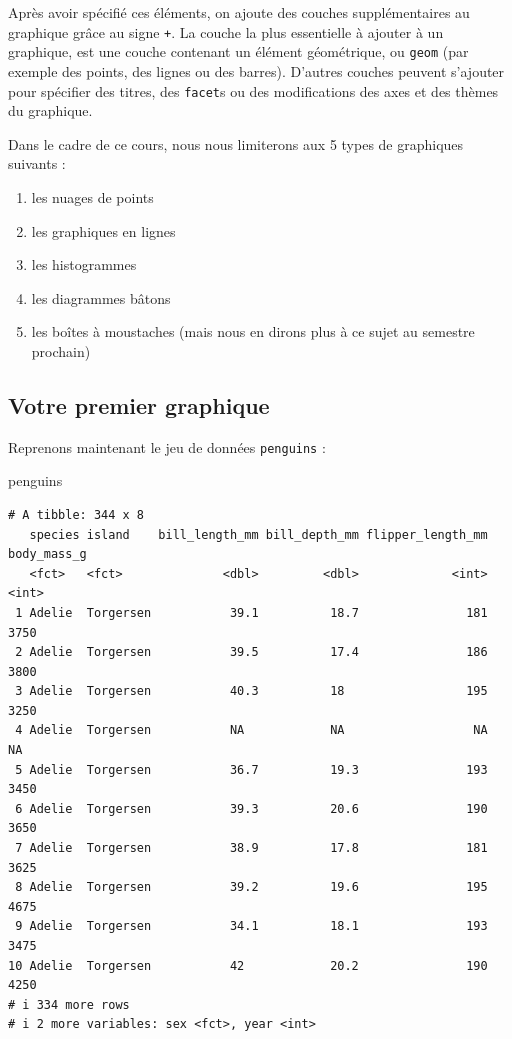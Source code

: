 \documentclass[
  a4paper,
  DIV=11,
  numbers=noendperiod,
  oneside]{scrreprt}
\newenvironment{Shaded}{}{}
\newcommand{\NormalTok}[1]{\textcolor[rgb]{0.14,0.16,0.18}{#1}}
\providecommand{\tightlist}{%
  \setlength{\itemsep}{0pt}\setlength{\parskip}{0pt}}\usepackage{longtable,booktabs,array}
\begin{document}
Après avoir spécifié ces éléments, on ajoute des couches supplémentaires
au graphique grâce au signe \texttt{+}. La couche la plus essentielle à
ajouter à un graphique, est une couche contenant un élément géométrique,
ou \texttt{geom} (par exemple des points, des lignes ou des barres).
D'autres couches peuvent s'ajouter pour spécifier des titres, des
\texttt{facet}s ou des modifications des axes et des thèmes du
graphique.

Dans le cadre de ce cours, nous nous limiterons aux 5 types de
graphiques suivants :

\begin{enumerate}
\def\labelenumi{\arabic{enumi}.}
\tightlist
\item
  les nuages de points
\item
  les graphiques en lignes
\item
  les histogrammes
\item
  les diagrammes bâtons
\item
  les boîtes à moustaches (mais nous en dirons plus à ce sujet au
  semestre prochain)
\end{enumerate}

\subsection{Votre premier graphique}\label{votre-premier-graphique}

Reprenons maintenant le jeu de données \texttt{penguins} :

\begin{Shaded}
\begin{Highlighting}[]
\NormalTok{penguins}
\end{Highlighting}
\end{Shaded}

\begin{verbatim}
# A tibble: 344 x 8
   species island    bill_length_mm bill_depth_mm flipper_length_mm body_mass_g
   <fct>   <fct>              <dbl>         <dbl>             <int>       <int>
 1 Adelie  Torgersen           39.1          18.7               181        3750
 2 Adelie  Torgersen           39.5          17.4               186        3800
 3 Adelie  Torgersen           40.3          18                 195        3250
 4 Adelie  Torgersen           NA            NA                  NA          NA
 5 Adelie  Torgersen           36.7          19.3               193        3450
 6 Adelie  Torgersen           39.3          20.6               190        3650
 7 Adelie  Torgersen           38.9          17.8               181        3625
 8 Adelie  Torgersen           39.2          19.6               195        4675
 9 Adelie  Torgersen           34.1          18.1               193        3475
10 Adelie  Torgersen           42            20.2               190        4250
# i 334 more rows
# i 2 more variables: sex <fct>, year <int>
\end{verbatim}
\end{document}
